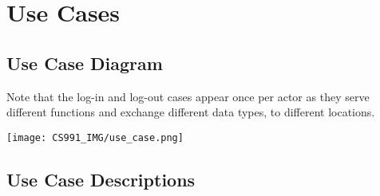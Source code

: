 \documentclass[11pt, english]{article}
\begin{document}
\newpage

\section{Use Cases}

	\subsection{Use Case Diagram}

	Note that the log-in and log-out cases appear once per actor as they serve different functions and exchange different data types, to different locations.

	\begin{center}
		\texttt{[image: CS991\_IMG/use\_case.png]}
	\end{center}

	\subsection{Use Case Descriptions}
\end{document}
